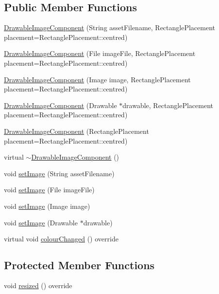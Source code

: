 \subsection*{Public Member Functions}
\begin{DoxyCompactItemize}
\item 
\mbox{\hyperlink{classDrawableImageComponent_a9147901da528e956ccabb6d77128ff94}{Drawable\+Image\+Component}} (String asset\+Filename, Rectangle\+Placement placement=Rectangle\+Placement\+::centred)
\item 
\mbox{\hyperlink{classDrawableImageComponent_ad1e3b464eb032dfefe350ea3c70b8f0e}{Drawable\+Image\+Component}} (File image\+File, Rectangle\+Placement placement=Rectangle\+Placement\+::centred)
\item 
\mbox{\hyperlink{classDrawableImageComponent_aeed2f498ba4b0445711c3645c6af0b4e}{Drawable\+Image\+Component}} (Image image, Rectangle\+Placement placement=Rectangle\+Placement\+::centred)
\item 
\mbox{\hyperlink{classDrawableImageComponent_a13f0c4653894511eba10d0760acae76b}{Drawable\+Image\+Component}} (Drawable $\ast$drawable, Rectangle\+Placement placement=Rectangle\+Placement\+::centred)
\item 
\mbox{\hyperlink{classDrawableImageComponent_a2957bb8bb70cc3c705930c4063d8cc04}{Drawable\+Image\+Component}} (Rectangle\+Placement placement=Rectangle\+Placement\+::centred)
\item 
virtual \mbox{\hyperlink{classDrawableImageComponent_a2b17b147e843a5f2e9b858aa9dbe097b}{$\sim$\+Drawable\+Image\+Component}} ()
\item 
void \mbox{\hyperlink{classDrawableImageComponent_a74bf1535fffd12dc85d42caa2f66e686}{set\+Image}} (String asset\+Filename)
\item 
void \mbox{\hyperlink{classDrawableImageComponent_a9bce5aac7018bff7be9905d43ddef7e3}{set\+Image}} (File image\+File)
\item 
void \mbox{\hyperlink{classDrawableImageComponent_a15816f3cb4e5208684a262bde75de7ff}{set\+Image}} (Image image)
\item 
void \mbox{\hyperlink{classDrawableImageComponent_a33fd94ab70a7dc014f6bdcb63fb6a6f9}{set\+Image}} (Drawable $\ast$drawable)
\item 
virtual void \mbox{\hyperlink{classDrawableImageComponent_a4480d8592f8eaf1dc9af9fa4da593e34}{colour\+Changed}} () override
\end{DoxyCompactItemize}
\subsection*{Protected Member Functions}
\begin{DoxyCompactItemize}
\item 
void \mbox{\hyperlink{classDrawableImageComponent_a6bba6901171873c4d3f63499f9c005bf}{resized}} () override
\end{DoxyCompactItemize}
